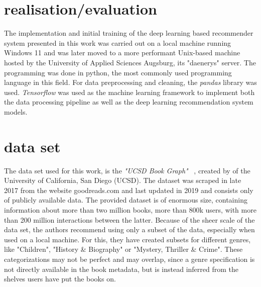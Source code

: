 \documentclass[10pt,final,journal,a4paper,oneside,twocolumn]{IEEEtran}
\begin{document}
\section{realisation/evaluation}
The implementation and initial training of the deep learning based recommender system presented in this work was carried out on a local machine running Windows 11 and was later moved to a more performant Unix-based machine hosted by the University of Applied Sciences Augsburg, its "daenerys" server.
The programming was done in python, the most commonly used programming language in this field. For data preprocessing and cleaning, the \emph{pandas} library was used.
\emph{Tensorflow} was used as the machine learning framework to implement both the data processing pipeline as well as the deep learning recommendation system models.


\section{data set}
The data set used for this work, is the \emph{"UCSD Book Graph"} \cite{Wan.2018}~\cite{Wan.2019}, created by \citeauthor{Wan.2018} of the University of California, San Diego (UCSD). The dataset was scraped in late 2017 from the website goodreads.com and last updated in 2019 and consists only of publicly available data. The provided dataset is of enormous size, containing information about more than two million books, more than 800k users, with more than 200 million interactions between the latter.
Because of the sheer scale of the data set, the authors recommend using only a subset of the data, especially when used on a local machine. For this, they have created subsets for different genres, like "Children", "History \& Biography" or "Mystery, Thriller \& Crime". These categorizations may not be perfect and may overlap, since a genre specification is not directly available in the book metadata, but is instead inferred from the shelves users have put the books on.
\end{document}
